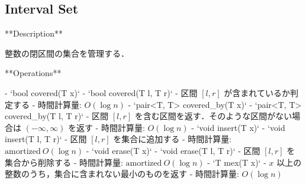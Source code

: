 \subsection{Interval Set}

\begin{small}
\begin{markdown}
**Description**

整数の閉区間の集合を管理する．

**Operations**

- `bool covered(T x)`
- `bool covered(T l, T r)`
    - 区間 $[l, r]$ が含まれているか判定する
    - 時間計算量: $O(\log n)$
- `pair<T, T> covered\_by(T x)`
- `pair<T, T> covered\_by(T l, T r)`
    - 区間 $[l, r]$ を含む区間を返す．そのような区間がない場合は $(-\infty, \infty)$ を返す
    - 時間計算量: $O(\log n)$
- `void insert(T x)`
- `void insert(T l, T r)`
    - 区間 $[l, r]$ を集合に追加する
    - 時間計算量: $\mathrm{amortized}\ O(\log n)$
- `void erase(T x)`
- `void erase(T l, T r)`
    - 区間 $[l, r]$ を集合から削除する
    - 時間計算量: $\mathrm{amortized}\ O(\log n)$
- `T mex(T x)`
    - $x$ 以上の整数のうち，集合に含まれない最小のものを返す
    - 時間計算量: $O(\log n)$

\end{markdown}
\end{small}

